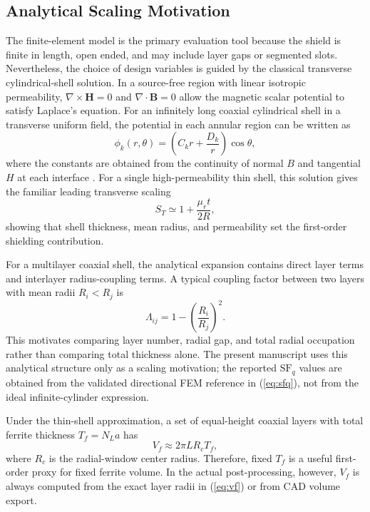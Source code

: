 \documentclass[letterpaper,journal]{IEEEtran}
\begin{document}
\subsection{Analytical Scaling Motivation}

The finite-element model is the primary evaluation tool because the shield is finite in length, open ended, and may include layer gaps or segmented slots. Nevertheless, the choice of design variables is guided by the classical transverse cylindrical-shell solution. In a source-free region with linear isotropic permeability, $\nabla\times\mathbf{H}=0$ and $\nabla\cdot\mathbf{B}=0$ allow the magnetic scalar potential to satisfy Laplace's equation. For an infinitely long coaxial cylindrical shell in a transverse uniform field, the potential in each annular region can be written as
\begin{equation}
\phi_k(r,\theta)=\left(C_k r+\frac{D_k}{r}\right)\cos\theta ,
\label{eq:scalarpotential}
\end{equation}
where the constants are obtained from the continuity of normal $B$ and tangential $H$ at each interface \cite{ref6}. For a single high-permeability thin shell, this solution gives the familiar leading transverse scaling
\begin{equation}
S_T \simeq 1+\frac{\mu_r t}{2R},
\label{eq:singlelayerscaling}
\end{equation}
showing that shell thickness, mean radius, and permeability set the first-order shielding contribution.

For a multilayer coaxial shell, the analytical expansion contains direct layer terms and interlayer radius-coupling terms. A typical coupling factor between two layers with mean radii $R_i<R_j$ is
\begin{equation}
\Lambda_{ij}=1-\left(\frac{R_i}{R_j}\right)^2 .
\label{eq:couplingfactor}
\end{equation}
This motivates comparing layer number, radial gap, and total radial occupation rather than comparing total thickness alone. The present manuscript uses this analytical structure only as a scaling motivation; the reported $\mathrm{SF}_q$ values are obtained from the validated directional FEM reference in (\ref{eq:sfq}), not from the ideal infinite-cylinder expression.

Under the thin-shell approximation, a set of equal-height coaxial layers with total ferrite thickness $T_f=N_La$ has
\begin{equation}
V_f\approx 2\pi L R_c T_f ,
\label{eq:vfapprox}
\end{equation}
where $R_c$ is the radial-window center radius. Therefore, fixed $T_f$ is a useful first-order proxy for fixed ferrite volume. In the actual post-processing, however, $V_f$ is always computed from the exact layer radii in (\ref{eq:vf}) or from CAD volume export.
\end{document}
